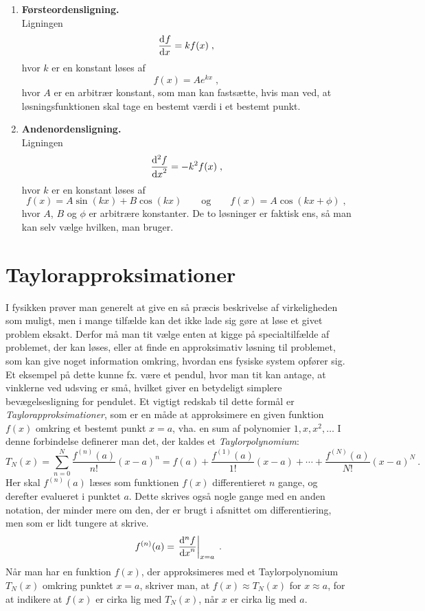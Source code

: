 \begin{enumerate}[resume]
	\item\label{itm:d-lign1} \textbf{Førsteordensligning.}\\
	Ligningen
	\[
	\dif{x}{f} = k f(x) \; ,
	\]
	hvor $k$ er en konstant løses af
	\[
	f(x) = A e^{kx} \; ,
	\]
	hvor $A$ er en arbitrær konstant, som man kan fastsætte, hvis man
	ved, at løsningsfunktionen skal tage en bestemt værdi i et bestemt
	punkt.
	\item\label{itm:d-lign2} \textbf{Andenordensligning.}\\
	Ligningen
	\[
	\dif[2]{x}{f} = -k^2 f(x) \; ,
	\]
	hvor $k$ er en konstant løses af
	\[
	f(x) = A \sin (kx) + B \cos (kx)
	\qquad \text{og} \qquad
	f(x) = A \cos (kx + \phi) \; ,
	\]
	hvor $A$, $B$ og $\phi$ er arbitrære konstanter. De to løsninger er
	faktisk ens, så man kan selv vælge hvilken, man bruger.
\end{enumerate} 

\section{Taylorapproksimationer}
I fysikken prøver man generelt at give en så præcis beskrivelse af virkeligheden som muligt, men i mange tilfælde kan det ikke lade sig gøre at løse et givet problem eksakt. Derfor må man tit vælge enten at kigge på specialtilfælde af problemet, der kan løses, eller at finde en approksimativ løsning til problemet, som kan give noget information omkring, hvordan ens fysiske system opfører sig. Et eksempel på dette kunne fx. være et pendul, hvor man tit kan antage, at vinklerne ved udsving er små, hvilket giver en betydeligt simplere bevægelsesligning for pendulet. Et vigtigt redskab til dette formål er \emph{Taylorapproksimationer}, som er en måde at approksimere en given funktion $f(x)$ omkring et bestemt punkt $x=a$, vha. en sum af polynomier $1,x,x^2,\ldots$ I denne forbindelse definerer man det, der kaldes et \emph{Taylorpolynomium}:
\begin{equation}
\label{Taylor_pol}
T_N(x) = \sum\limits_{n = 0}^{N} \frac{f^{(n)}(a)}{n!} (x-a)^n = f(a) + \frac{f^{(1)}(a)}{1!} (x-a)  + \cdots + \frac{f^{(N)}(a)}{N!}(x-a)^N  \ .
\end{equation}
Her skal $f^{(n)}(a)$ læses som funktionen $f(x)$ differentieret $n$ gange, og derefter evalueret i punktet $a$. Dette skrives også nogle gange med en anden notation, der minder mere om den, der er brugt i afsnittet om differentiering, men som er lidt tungere at skrive.
\begin{equation*}
f^{(n)}(a) = \left.\dif[n]{x}{f}\right|_ {x=a} \; .
\end{equation*}
Når man har en funktion $f(x)$, der approksimeres med et Taylorpolynomium $T_N(x)$ omkring punktet $x=a$, skriver man, at $f(x) \approx T_N(x)$ for $x \approx a$, for at indikere at $f(x)$ er cirka lig med $T_N(x)$, når $x$ er cirka lig med $a$.\\

